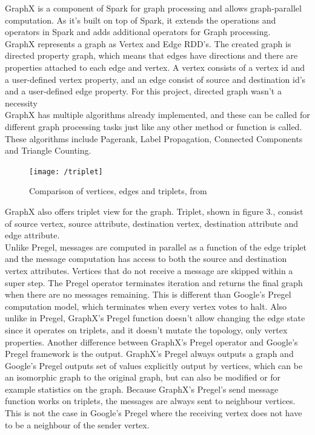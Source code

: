 \documentclass{article}
\theoremstyle{definition}
\begin{document}
GraphX is a component of Spark for graph processing and allows graph-parallel computation. As it's built on top of Spark, it extends the operations and operators in Spark and adds additional operators for Graph processing.  \\

GraphX represents a graph as Vertex and Edge RDD's. The created graph is directed property graph, which means that edges have directions and there are properties attached to each edge and vertex.  A vertex consists of a vertex id and a user-defined vertex property, and an edge consist of source and destination id's and a user-defined edge property. For this project, directed graph wasn't a necessity \\

GraphX has multiple algorithms already implemented, and these can be called for different graph processing tasks just like any other method or function is called. These algorithms include Pagerank, Label Propagation, Connected Components and Triangle Counting. 

\begin{figure}[H]
\centering
\texttt{[image: /triplet]}
\caption{Comparison of vertices, edges and triplets, from \cite{GraphX} }
\end{figure}

GraphX also offers triplet view for the graph. Triplet, shown in figure 3., consist of source vertex, source attribute, destination vertex, destination attribute and edge attribute. \\

Unlike Pregel, messages are computed in parallel as a function of the edge triplet and the message computation has access to both the source and destination vertex attributes. Vertices that do not receive a message are skipped within a super step. The Pregel operator terminates iteration and returns the final graph when there are no messages remaining. This is different than Google's Pregel computation model, which terminates when every vertex votes to halt. Also unlike in Pregel, GraphX's Pregel function doesn't allow changing the edge state since it operates on triplets, and it doesn't mutate the topology, only vertex properties. Another difference between GraphX's Pregel operator and Google's Pregel framework is the output. GraphX's Pregel always outputs a graph and Google's Pregel outputs set of values explicitly output by vertices, which can be an isomorphic graph to the original graph, but can also be modified or for example statistics on the graph. Because GraphX's Pregel's send message function works on triplets, the messages are always sent to neighbour vertices. This is not the case in Google's Pregel where the receiving vertex does not have to be a neighbour of the sender vertex. \\
\end{document}
